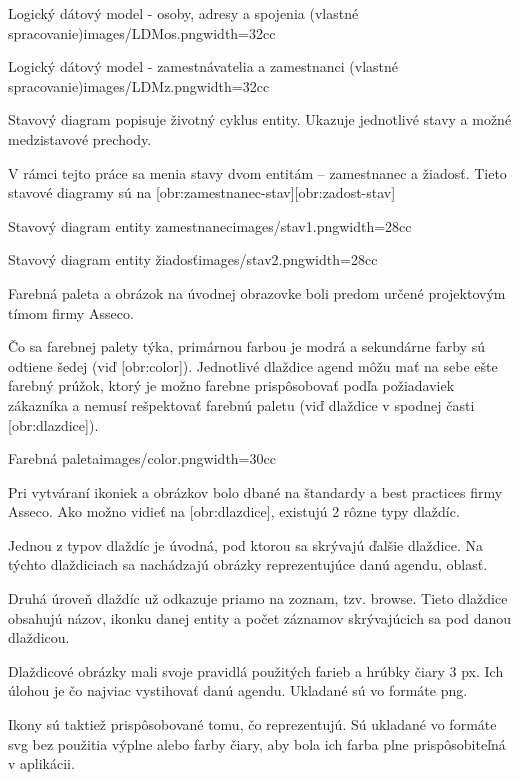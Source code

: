{Logický dátový model - osoby, adresy a spojenia (vlastné spracovanie)}{images/LDMos.png}{width=32cc}

{Logický dátový model - zamestnávatelia a zamestnanci (vlastné spracovanie)}{images/LDMz.png}{width=32cc}

Stavový diagram popisuje životný cyklus entity. Ukazuje jednotlivé stavy a možné medzistavové prechody.

V rámci tejto práce sa menia stavy dvom entitám -- zamestnanec a žiadosť. Tieto stavové diagramy sú na [obr:zamestnanec-stav][obr:zadost-stav]

{Stavový diagram entity zamestnanec}{images/stav1.png}{width=28cc} 


{Stavový diagram entity žiadosť}{images/stav2.png}{width=28cc} 

Farebná paleta a obrázok na úvodnej obrazovke boli predom určené projektovým tímom firmy Asseco.

Čo sa farebnej palety týka, primárnou farbou je modrá a sekundárne farby sú odtiene šedej (viď [obr:color]). Jednotlivé dlaždice agend môžu mať na sebe ešte farebný prúžok, ktorý je možno farebne prispôsobovať podľa požiadaviek zákazníka a nemusí rešpektovať farebnú paletu (viď dlaždice v spodnej časti [obr:dlazdice]).

{Farebná paleta}{images/color.png}{width=30cc} 

Pri vytváraní ikoniek a obrázkov bolo dbané na štandardy a best practices firmy Asseco. Ako možno vidieť na [obr:dlazdice], existujú 2 rôzne typy dlaždíc. 

Jednou z typov dlaždíc je úvodná, pod ktorou sa skrývajú ďalšie dlaždice. Na týchto dlaždiciach sa nachádzajú obrázky reprezentujúce danú agendu, oblasť. 

Druhá úroveň dlaždíc už odkazuje priamo na zoznam, tzv. browse. Tieto dlaždice obsahujú názov, ikonku danej entity a počet záznamov skrývajúcich sa pod danou dlaždicou. 

Dlaždicové obrázky mali svoje pravidlá použitých farieb a hrúbky čiary 3 px. Ich úlohou je čo najviac vystihovať danú agendu. Ukladané sú vo formáte png. 

Ikony sú taktiež prispôsobované tomu, čo reprezentujú. Sú ukladané vo formáte svg bez použitia výplne alebo farby čiary, aby bola ich farba plne prispôsobiteľná v aplikácii.

